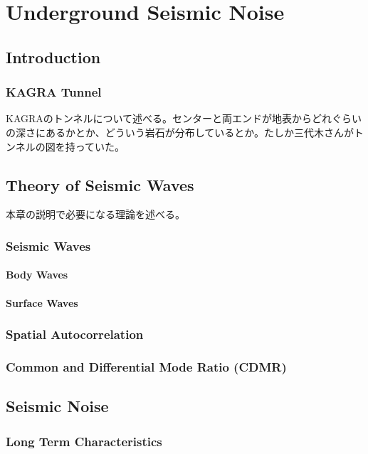 \chapter{Underground Seismic Noise} %




\section{Introduction} %
\subsection{KAGRA Tunnel}
KAGRAのトンネルについて述べる。センターと両エンドが地表からどれぐらいの深さにあるかとか、どういう岩石が分布しているとか。たしか三代木さんがトンネルの図を持っていた。




\section{Theory of Seismic Waves} %
本章の説明で必要になる理論を述べる。
\subsection{Seismic Waves}
\subsubsection{Body Waves}
\subsubsection{Surface Waves}
\subsection{Spatial Autocorrelation}
\subsection{Common and Differential Mode Ratio (CDMR)}





\section{Seismic Noise} %
\subsection{Long Term Characteristics}
